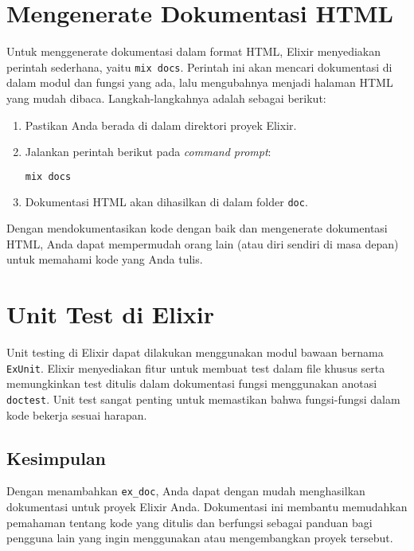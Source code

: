\section{Mengenerate Dokumentasi HTML}

Untuk menggenerate dokumentasi dalam format HTML, Elixir menyediakan perintah sederhana, yaitu \texttt{mix docs}. Perintah ini akan mencari dokumentasi di dalam modul dan fungsi yang ada, lalu mengubahnya menjadi halaman HTML yang mudah dibaca. Langkah-langkahnya adalah sebagai berikut:

\begin{enumerate}
	\item Pastikan Anda berada di dalam direktori proyek Elixir.
	\item Jalankan perintah berikut pada \textit{command prompt}:
	\begin{lstlisting}[language=Bash]
mix docs
	\end{lstlisting}
	
	\item Dokumentasi HTML akan dihasilkan di dalam folder \texttt{doc}.
\end{enumerate}

Dengan mendokumentasikan kode dengan baik dan mengenerate dokumentasi HTML, Anda dapat mempermudah orang lain (atau diri sendiri di masa depan) untuk memahami kode yang Anda tulis.



\section{Unit Test di Elixir}

Unit testing di Elixir dapat dilakukan menggunakan modul bawaan bernama \texttt{ExUnit}. Elixir menyediakan fitur untuk membuat test dalam file khusus serta memungkinkan test ditulis dalam dokumentasi fungsi menggunakan anotasi \texttt{doctest}. Unit test sangat penting untuk memastikan bahwa fungsi-fungsi dalam kode bekerja sesuai harapan.



\subsection{Kesimpulan}

Dengan menambahkan \texttt{ex\_doc}, Anda dapat dengan mudah menghasilkan dokumentasi untuk proyek Elixir Anda. Dokumentasi ini membantu memudahkan pemahaman tentang kode yang ditulis dan berfungsi sebagai panduan bagi pengguna lain yang ingin menggunakan atau mengembangkan proyek tersebut.


